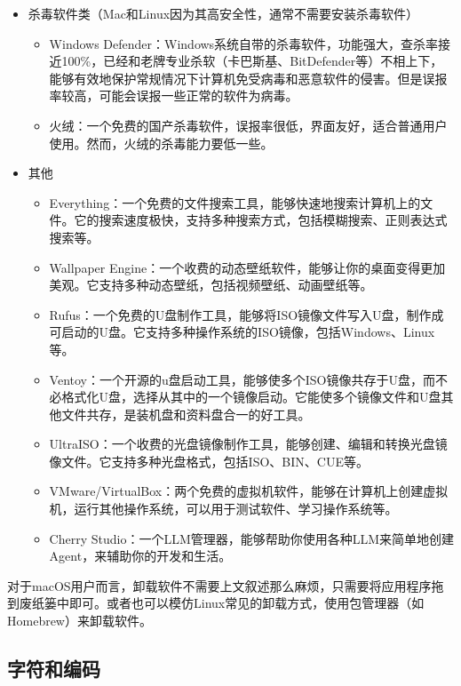 \begin{itemize}
\begin{itemize}
    \end{itemize}
  \item 杀毒软件类（Mac和Linux因为其高安全性，通常不需要安装杀毒软件）
    \begin{itemize}
      \item Windows Defender：Windows系统自带的杀毒软件，功能强大，查杀率接近100\%，已经和老牌专业杀软（卡巴斯基、BitDefender等）不相上下，能够有效地保护常规情况下计算机免受病毒和恶意软件的侵害。但是误报率较高，可能会误报一些正常的软件为病毒。
      \item 火绒：一个免费的国产杀毒软件，误报率很低，界面友好，适合普通用户使用。然而，火绒的杀毒能力要低一些。
    \end{itemize}
  \item 其他
    \begin{itemize}
      \item Everything：一个免费的文件搜索工具，能够快速地搜索计算机上的文件。它的搜索速度极快，支持多种搜索方式，包括模糊搜索、正则表达式搜索等。
      \item Wallpaper Engine：一个收费的动态壁纸软件，能够让你的桌面变得更加美观。它支持多种动态壁纸，包括视频壁纸、动画壁纸等。
      \item Rufus：一个免费的U盘制作工具，能够将ISO镜像文件写入U盘，制作成可启动的U盘。它支持多种操作系统的ISO镜像，包括Windows、Linux等。
      \item Ventoy：一个开源的u盘启动工具，能够使多个ISO镜像共存于U盘，而不必格式化U盘，选择从其中的一个镜像启动。它能使多个镜像文件和U盘其他文件共存，是装机盘和资料盘合一的好工具。
      \item UltraISO：一个收费的光盘镜像制作工具，能够创建、编辑和转换光盘镜像文件。它支持多种光盘格式，包括ISO、BIN、CUE等。
      \item VMware/VirtualBox：两个免费的虚拟机软件，能够在计算机上创建虚拟机，运行其他操作系统，可以用于测试软件、学习操作系统等。
      \item Cherry Studio：一个LLM管理器，能够帮助你使用各种LLM来简单地创建Agent，来辅助你的开发和生活。
    \end{itemize}
\end{itemize}

\begin{tip}
对于macOS用户而言，卸载软件不需要上文叙述那么麻烦，只需要将应用程序拖到废纸篓中即可。或者也可以模仿Linux常见的卸载方式，使用包管理器（如Homebrew）来卸载软件。
\end{tip}

\subsection{字符和编码}\label{sec:locale}

